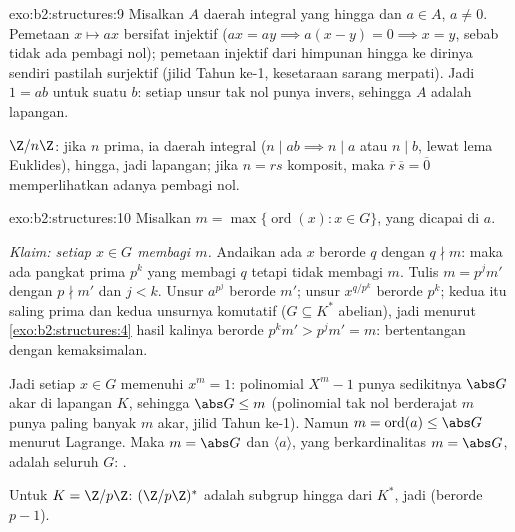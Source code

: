 \begin{solution}{exo:b2:structures:9}
Misalkan $A$ daerah integral yang hingga dan $a \in A$, $a \neq 0$.
Pemetaan $x \mapsto ax$ bersifat injektif ($ax = ay \implies a(x - y) = 0
\implies x = y$, sebab tidak ada pembagi nol); pemetaan injektif dari
himpunan hingga ke dirinya sendiri pastilah surjektif (jilid Tahun ke-1,
kesetaraan sarang merpati). Jadi $1 = ab$ untuk suatu $b$: setiap unsur
tak nol punya invers, sehingga $A$ adalah lapangan.

$\Z/n\Z$: jika $n$ prima, ia daerah integral ($n \mid ab
\implies n \mid a$ atau $n \mid b$, lewat lema Euklides), hingga, jadi
lapangan; jika $n = rs$ komposit, maka $\overline r\,\overline s =
\overline 0$ memperlihatkan adanya pembagi nol.
\end{solution}

\begin{solution}{exo:b2:structures:10}
Misalkan $m = \max\{\operatorname{ord}(x) : x \in G\}$, yang dicapai di $a$.

\emph{Klaim:  setiap $x \in G$ membagi $m$.} Andaikan ada
$x$ berorde $q$ dengan $q \nmid m$: maka ada pangkat prima $p^k$ yang
membagi $q$ tetapi tidak membagi $m$. Tulis $m = p^j m'$ dengan $p \nmid
m'$ dan $j < k$. Unsur $a^{p^j}$ berorde $m'$; unsur
$x^{q/p^k}$ berorde $p^k$; kedua  itu saling prima dan kedua
unsurnya komutatif ($G \subseteq K^*$ abelian), jadi menurut
\cref{exo:b2:structures:4} hasil kalinya berorde $p^k m' > p^j m'
= m$: bertentangan dengan kemaksimalan.

Jadi setiap $x \in G$ memenuhi $x^m = 1$: polinomial $X^m - 1$ punya
sedikitnya $\abs G$ akar di lapangan $K$, sehingga $\abs G \leq m$
(polinomial tak nol berderajat $m$ punya paling banyak $m$ akar, jilid
Tahun ke-1). Namun $m = \operatorname{ord}(a) \leq \abs G$ menurut
Lagrange. Maka $m = \abs G$ dan $\langle a \rangle$, yang berkardinalitas
$m = \abs G$, adalah seluruh $G$: .

Untuk $K = \Z/p\Z$: $(\Z/p\Z)^*$ adalah subgrup hingga dari $K^*$, jadi
 (berorde $p - 1$).
\end{solution}

